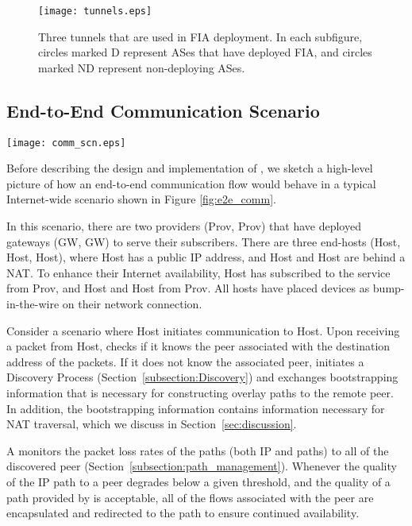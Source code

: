 \begin{figure}
	\centering
	\texttt{[image: tunnels.eps]}
	
	\caption{Three tunnels that are used in FIA deployment. In each subfigure,
		circles marked D represent ASes that have deployed FIA, and circles 
		marked
		ND represent non-deploying ASes.}
	
	\label{fig:tunnels}
\end{figure}

\subsection{End-to-End Communication Scenario}
\label{sec:e2e_scenario}

\begin{figure*}
\centering
\texttt{[image: comm\_scn.eps]}
\caption{An example of end-to-end communication. The destination identifier is
implemented as the 5-tuple information. See Section~\ref{sec:design}.}
\label{fig:e2e_comm}
\end{figure*}

Before describing the design and implementation of \name, we sketch a
high-level picture of how an end-to-end communication flow would behave in a
typical Internet-wide scenario shown in Figure \ref{fig:e2e_comm}.

In this scenario, there are two \scion providers (Prov, Prov) that have
deployed gateways (GW, GW) to serve their \scion subscribers. There are
three end-hosts (Host, Host, Host), where Host has a public IP
address, and Host and Host are behind a NAT. To enhance their Internet
availability, Host has subscribed to the \scion service from Prov, and
Host and Host from Prov. All hosts have placed \name devices as
bump-in-the-wire on their network connection.

Consider a scenario where Host initiates communication to Host. Upon
receiving a packet from Host, \namens checks if it knows the peer \name
associated with the destination address of the packets. If it does not know the
associated peer, \namens initiates a Discovery Process
(Section~\ref{subsection:Discovery}) and exchanges bootstrapping information
that is necessary for constructing \scion overlay paths to the remote peer. In
addition, the bootstrapping information contains information necessary for NAT
traversal, which we discuss in Section~\ref{sec:discussion}.

A \name monitors the packet loss  rates of the paths (both IP and \scion paths)
to all of the discovered peer \names
(Section~\ref{subsection:path_management}). Whenever the quality of the IP path
to a peer \name degrades below a given threshold, and the quality of a path
provided by \scion is acceptable, all of the flows associated with the peer
\name are encapsulated and redirected to the \scion path to ensure continued
availability.


